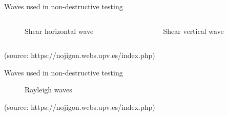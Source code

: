 \documentclass[10pt,aspectratio=169,dvipsnames]{beamer} %
\begin{document}
	\begin{frame}{Waves used in non-destructive testing}
		\begin{columns}[T]
			\begin{column}{0.5\textwidth}
				\centering
				\begin{figure}
					\caption{\alert{Shear horizontal wave}}
				\end{figure}			
			\end{column}
			\begin{column}{0.5\textwidth}
				\centering
				\begin{figure}
					\caption{\alert{Shear vertical wave}}
				\end{figure}			
			\end{column}	
		\end{columns}
		\tiny 
		(source: https://nojigon.webs.upv.es/index.php)
	\end{frame}
	\setcounter{subfigure}{0}
	\begin{frame}{Waves used in non-destructive testing}
		\begin{figure}
			\centering
			\caption{\alert{Rayleigh waves}}		
		\end{figure}			
		\tiny 
		(source: https://nojigon.webs.upv.es/index.php)
	\end{frame}
	\setcounter{subfigure}{0}
\end{document}
